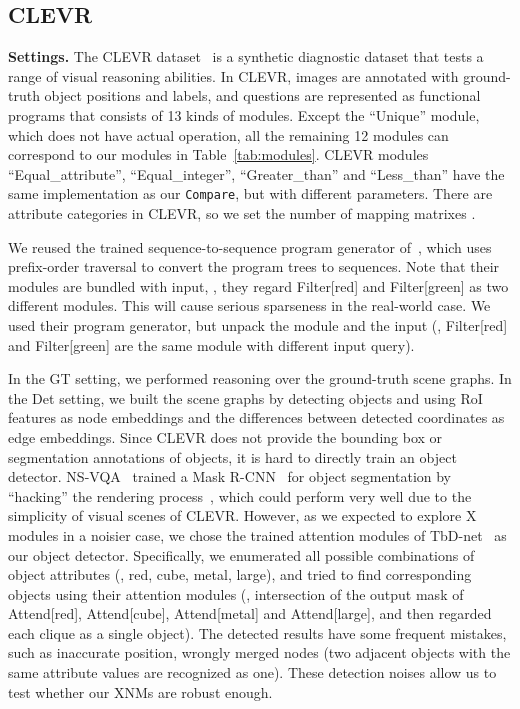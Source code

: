 \documentclass[10pt,twocolumn,letterpaper]{article}
\begin{document}
\subsection{CLEVR}
\vspace{-0.1cm}

\textbf{Settings.}
The CLEVR dataset~\cite{johnson2017clevr} is a synthetic diagnostic dataset that tests a range of visual reasoning abilities.
In CLEVR, images are annotated with ground-truth object positions and labels, and questions are represented as functional programs that consists of 13 kinds of modules.
Except the ``Unique'' module, which does not have actual operation, all the remaining 12 modules can correspond to our modules in Table~\ref{tab:modules}.
CLEVR modules ``Equal\_attribute'', ``Equal\_integer'', ``Greater\_than'' and ``Less\_than'' have the same implementation as our \texttt{Compare}, but with different parameters.
There are  attribute categories in CLEVR, so we set the number of mapping matrixes .


We reused the trained sequence-to-sequence program generator of~\cite{johnson2017inferring,mascharka2018transparency}, which uses prefix-order traversal to convert the program trees to sequences.
Note that their modules are bundled with input, \eg, they regard Filter[red] and Filter[green] as two different modules.
This will cause serious sparseness in the real-world case.
We used their program generator, but unpack the module and the input (\eg, Filter[red] and Filter[green] are the same module with different input query).

In the GT setting, we performed reasoning over the ground-truth scene graphs.
In the Det setting, we built the scene graphs by detecting objects and using RoI features as node embeddings and the differences between detected coordinates as edge embeddings.
Since CLEVR does not provide the bounding box or segmentation annotations of objects, it is hard to directly train an object detector. NS-VQA~\cite{yi2018nsvqa} trained a Mask R-CNN~\cite{he2017mask} for object segmentation by ``hacking'' the rendering process~\cite{johnson2017clevr}, which could perform very well due to the simplicity of visual scenes of CLEVR. However, as we expected to explore X modules in a noisier case, we chose the trained attention modules of TbD-net~\cite{mascharka2018transparency} as our object detector.
Specifically, we enumerated all possible combinations of object attributes (\eg, red, cube, metal, large), and tried to find corresponding objects using their attention modules (\eg, intersection of the output mask of Attend[red], Attend[cube], Attend[metal] and Attend[large], and then regarded each clique as a single object).
The detected results have some frequent mistakes, such as inaccurate position, wrongly merged nodes (two adjacent objects with the same attribute values are recognized as one). These detection noises allow us to test whether our XNMs are robust enough.
\end{document}
